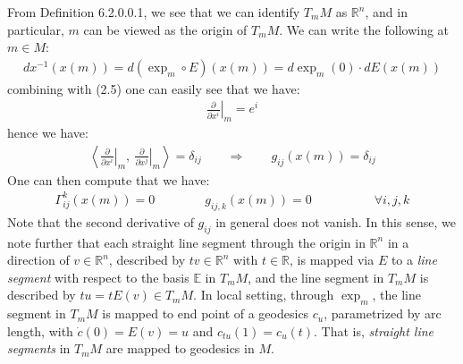 \documentclass[11pt]{book}
\theoremstyle{break}
\theoremstyle{break}
\newcommand{\R}{\mathbb{R}}
\newcommand{\pd}{\partial}
\begin{document}
From Definition 6.2.0.0.1, we see that we can identify $T_mM$ as $\R^n$, and in particular, $m$ can be viewed as the origin of $T_mM$. We can write the following at $m \in M$:
\begin{align*}
dx^{-1}(x(m)) = d(\exp_m \circ E)(x(m)) = d\exp_m(0) \cdot dE(x(m))
\end{align*}
combining with (2.5) one can easily see that we have:
\begin{align*}
\left.\frac{\pd}{\pd x^i}\right|_m = e^i
\end{align*}
hence we have:
\begin{align*}
\left\langle \left.\frac{\pd}{\pd x^i}\right|_m ,\ \left.\frac{\pd}{\pd x^j}\right|_m    \right\rangle = \delta_{ij}\qquad \Rightarrow \qquad g_{ij}(x(m)) = \delta_{ij}
\end{align*}
One can then compute that we have:
\begin{align*}
\Gamma_{ij}^k(x(m)) = 0\qquad\qquad g_{ij,k}(x(m)) = 0 \quad\qquad\qquad\forall i,j,k
\end{align*}
Note that the second derivative of $g_{ij}$ in general does not vanish.  In this sense, we note further that each straight line segment through the origin in $\R^n$ in a direction of $v\in \R^n$, described by $tv \in \R^n$ with $t \in \R$, is mapped via $E$ to a \textit{line segment} with respect to the basis $\mathbb{E}$ in $T_mM$, and the line segment in $T_mM$ is described by $tu = tE(v) \in T_mM$. In local setting, through $\exp_m$, the line segment in $T_mM$ is mapped to end point of a geodesics $c_u$, parametrized by arc length, with $\dot{c}(0) = E(v) = u$ and $c_{tu}(1) = c_u(t)$. That is, \textit{straight line segments} in $T_mM$ are mapped to geodesics in $M$.\\
\end{document}
